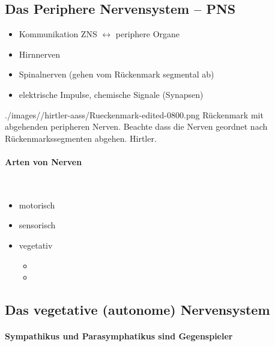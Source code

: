 \subsection{Das Periphere Nervensystem -- PNS}


{
\begin{itemize}
    \item Kommunikation ZNS ${\longleftrightarrow}$
    periphere  Organe
    \item Hirnnerven %
    \item Spinalnerven (gehen vom Rückenmark segmental ab)
    \item elektrische Impulse, chemische Signale (Synapsen)
\end{itemize}
}
{}
{./images//hirtler-aass/Rueckenmark-edited-0800.png}
{\gAuthNotesPicLegalOk{}{}Rückenmark
mit abgehenden peripheren Nerven. Beachte dass die Nerven
geordnet nach Rückenmarkssegmenten abgehen.}
{Hirtler.}


\paragraph{Arten von Nerven}~

\begin{itemize}
    \item motorisch   
    \item sensorisch  
    \item vegetativ  
    \begin{itemize}
        \item {}
        \item {}
    \end{itemize}
\end{itemize}


\subsection{Das vegetative (autonome)  Nervensystem}

 
\paragraph{Sympathikus  und Parasymphatikus  sind 
Gegenspieler}~
    

